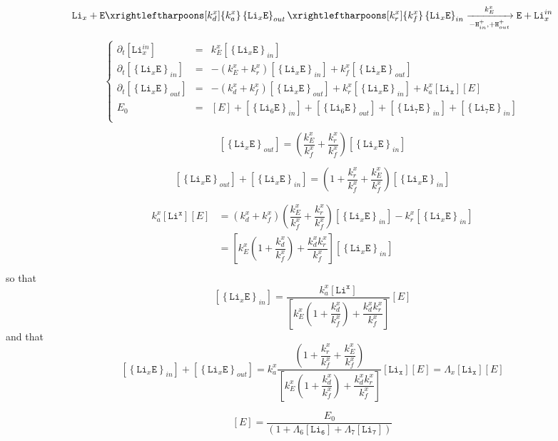 \documentclass[aps,onecolumn]{revtex4}
\newcommand{\mychem}[1]{\mathtt{#1}}
\newcommand{\myconc}[1]{\left\lbrack{#1}\right\rbrack}
\newcommand{\LiEin}[1]{\myconc{\left\lbrace\mychem{Li}_{#1}\mychem{E}\right\rbrace_{in}}}
\newcommand{\LiEout}[1]{\myconc{\left\lbrace\mychem{Li}_{#1}\mychem{E}\right\rbrace_{out}}}
\begin{document}
\begin{equation}
	 \mychem{Li}_{x} +  \mychem{E}  
	 \xrightleftharpoons[k_d^x]{k_a^x} 
	 \left\lbrace\mychem{Li}_{x}\mychem{E}\right\rbrace_{out} 
	  \xrightleftharpoons[k_r^x]{k_f^x} 
	  \left\lbrace\mychem{Li}_{x}\mychem{E}\right\rbrace_{in}  
	   \xrightarrow[-\mychem{H}^+_{in},+\mychem{H}^+_{out}]{k_E^x} \mychem{E}  + \mychem{Li}_{x}^{in}
\end{equation}

\begin{equation}
\left\lbrace
\begin{array}{rcl}
	\partial_t \myconc{\mychem{Li}^{in}_x} & = & k_E^x \LiEin{x} \\
	\partial_t \LiEin{x} & = & 
	-\left(k_E^x+k_r^x\right) \LiEin{x}+k_f^x \LiEout{x}
	\\
	\partial_t \LiEout{x} & = &
	-\left(k_d^x+k_f^x\right) \LiEout{x}
	+k_r^x \LiEin{x}
	+k_a^x \myconc{\mychem{Li_x}} \myconc{E}
	\\
	E_0 & = & \myconc{E} + \LiEin{6} + \LiEout{6} + \LiEin{7}+\LiEin{7}\\
\end{array}
\right.
\end{equation}

\begin{equation}
	\LiEout{x} = \left(\dfrac{k_E^x}{k_f^x} + \dfrac{k_r^x}{k_f^x} \right) \LiEin{x}	
\end{equation}



\begin{equation}
	\LiEout{x} + \LiEin{x} = \left(1+\dfrac{k_r^x}{k_f^x} +\dfrac{k_E^x}{k_f^x}  \right) \LiEin{x}
\end{equation}

\begin{equation}
\begin{array}{rl}
k_a^x \myconc{\mychem{Li^x}} \myconc{E} & =  \left(k_d^x+k_f^x\right) \left(\dfrac{k_E^x}{k_f^x} + \dfrac{k_r^x}{k_f^x} \right) \LiEin{x} - k_r^x \LiEin{x}\\
& = \left\lbrack k_E^x \left(1+\dfrac{k_d^x}{k_f^x} \right) + \dfrac{k_d^xk_r^x}{k_f^x} \right\rbrack \LiEin{x}\\
\end{array}
\end{equation}
so that
\begin{equation}
	\LiEin{x} = \dfrac{k_a^x \myconc{\mychem{Li^x}} }{\left\lbrack k_E^x \left(1+\dfrac{k_d^x}{k_f^x} \right) + \dfrac{k_d^xk_r^x}{k_f^x} \right\rbrack} \myconc{E}
\end{equation}
and that
\begin{equation}
	\LiEin{x} + \LiEout{x} = k_a^x\dfrac{ \left(1+\dfrac{k_r^x}{k_f^x} +\dfrac{k_E^x}{k_f^x}  \right) }{\left\lbrack k_E^x \left(1+\dfrac{k_d^x}{k_f^x} \right) + \dfrac{k_d^xk_r^x}{k_f^x} \right\rbrack} \myconc{\mychem{Li_x}} \myconc{E} = \Lambda_x \myconc{\mychem{Li_x}} \myconc{E}
\end{equation}

\begin{equation}
	\myconc{E} = \dfrac{E_0}{\left(1+\Lambda_6 \myconc{\mychem{Li_6}} + \Lambda_7 \myconc{\mychem{Li_7}}\right)}
\end{equation}
\end{document}
